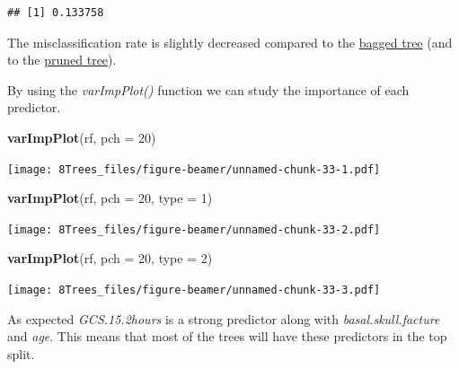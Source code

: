 \documentclass[10pt,ignorenonframetext,]{beamer}
\newenvironment{Shaded}{\begin{snugshade}}{\end{snugshade}}
\newcommand{\KeywordTok}[1]{\textcolor[rgb]{0.13,0.29,0.53}{\textbf{#1}}}
\newcommand{\DataTypeTok}[1]{\textcolor[rgb]{0.13,0.29,0.53}{#1}}
\newcommand{\DecValTok}[1]{\textcolor[rgb]{0.00,0.00,0.81}{#1}}
\newcommand{\NormalTok}[1]{#1}
\begin{document}
\begin{frame}[fragile]
\begin{verbatim}
## [1] 0.133758
\end{verbatim}

\normalsize

The misclassification rate is slightly decreased compared to the
\href{bagex}{bagged tree} (and to the \href{expruning}{pruned tree}).

\end{frame}

\begin{frame}[fragile]

By using the \emph{varImpPlot()} function we can study the importance of
each predictor.

\begin{Shaded}
\begin{Highlighting}[]
\KeywordTok{varImpPlot}\NormalTok{(rf, }\DataTypeTok{pch =} \DecValTok{20}\NormalTok{)}
\end{Highlighting}
\end{Shaded}

\texttt{[image: 8Trees\_files/figure-beamer/unnamed-chunk-33-1.pdf]}

\begin{Shaded}
\begin{Highlighting}[]
\KeywordTok{varImpPlot}\NormalTok{(rf, }\DataTypeTok{pch =} \DecValTok{20}\NormalTok{, }\DataTypeTok{type =} \DecValTok{1}\NormalTok{)}
\end{Highlighting}
\end{Shaded}

\texttt{[image: 8Trees\_files/figure-beamer/unnamed-chunk-33-2.pdf]}

\begin{Shaded}
\begin{Highlighting}[]
\KeywordTok{varImpPlot}\NormalTok{(rf, }\DataTypeTok{pch =} \DecValTok{20}\NormalTok{, }\DataTypeTok{type =} \DecValTok{2}\NormalTok{)}
\end{Highlighting}
\end{Shaded}

\texttt{[image: 8Trees\_files/figure-beamer/unnamed-chunk-33-3.pdf]}

As expected \emph{GCS.15.2hours} is a strong predictor along with
\emph{basal.skull.facture} and \emph{age}. This means that most of the
trees will have these predictors in the top split.

\end{frame}
\end{document}
